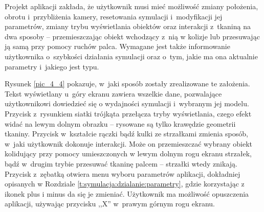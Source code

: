 		
		
		Projekt aplikacji zakłada, że użytkownik musi mieć możliwość zmiany położenia, obrotu i~przybliżenia kamery, resetowania symulacji i~modyfikacji jej parametrów, zmiany trybu wyświetlania obiektów oraz interakcji z~tkaniną na dwa sposoby -- przemieszczając obiekt wchodzący z~nią w kolizje lub przesuwając ją samą przy pomocy ruchów palca. Wymagane jest także informowanie użytkownika o~szybkości działania symulacji oraz o~tym, jakie ma ona aktualnie parametry i~jakiego jest typu.
		
		Rysunek \ref{pic_4_4} pokazuje, w~jaki sposób zostały zrealizowane te założenia. Tekst wyświetlany u~góry ekranu zawiera wszelkie dane, pozwalające użytkownikowi dowiedzieć się o wydajności symulacji i~wybranym jej modelu. Przycisk z~rysunkiem siatki trójkąta przełącza tryby wyświetlania, czego efekt widać na lewym dolnym obrazku -- rysowane są tylko krawędzie geometrii tkaniny. Przycisk w~kształcie rączki bądź kulki ze strzałkami zmienia sposób, w~jaki użytkownik dokonuje interakcji. Może on przemieszczać wybrany obiekt kolidujący przy pomocy umieszczonych w lewym dolnym rogu ekranu strzałek, bądź w~drugim trybie przesuwać tkaninę palcem -- strzałki wtedy znikają. Przycisk z~zębatką otwiera menu wyboru parametrów aplikacji, dokładniej opisanych w Rozdziale \ref{t:symulacja:dzialanie:parametry}, gdzie korzystając z ikonek plus i minus da się je zmieniać. Użytkownik ma możliwość opuszczenia aplikacji, używając przycisku ,,X'' w~prawym górnym rogu ekranu.
